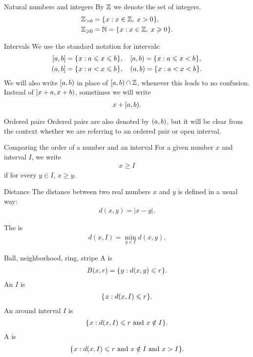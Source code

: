 \documentclass[12pt]{memoir}
\begin{document}
\begin{flushdescription}

\item [Natural numbers and integers] 
By $\mathbb{Z}$ we denote the set of integers.
\begin{align*}
   \mathbb{Z}_{>0}&=\mathopen\{\mskip 1mu x : x\in \mathbb{Z},\;  x>0\mskip 1mu\mathclose\}, \\
   \mathbb{Z}_{\geqslant 0}&=\mathbb{N}=\mathopen\{\mskip 1mu x : x\in \mathbb{Z},\;  x\geqslant 0\mskip 1mu\mathclose\}.
\end{align*}

\item [Intervals]
We use the standard notation for intervals:
\begin{align*}
   [a,b]&=\mathopen\{\mskip 1mu x : a\leqslant x \leqslant b\mskip 1mu\mathclose\},\quad [a,b)=\mathopen\{\mskip 1mu x : a\leqslant x < b\mskip 1mu\mathclose\}, \\
   (a,b]&=\mathopen\{\mskip 1mu x : a< x \leqslant b\mskip 1mu\mathclose\}, \quad  (a,b)=\mathopen\{\mskip 1mu x : a< x < b\mskip 1mu\mathclose\}.
\end{align*}
We will also write \( [a,b) \) in place of \( [a,b)\cap \mathbb{Z} \), 
whenever this leads to no confusion.
Instead of \( [x+a,x+b) \), sometimes we will write 
\begin{align*}x + [a,b).\end{align*}

\item [Ordered pairs]
Ordered pairs are also denoted by \( (a,b) \),
but it will be clear from the context whether we are
referring to an ordered pair or open interval.

\item [Comparing the order of a number and an interval]
For a given number $x$ and interval $I$, we
write
\begin{align*} x \ge I \end{align*}
if for every $y\in I$,  $x \ge y$.

\item [Distance]
The distance between two real numbers $x$ and $y$ is defined
in a usual way:
\begin{align*}
    d(x,y)= |x-y|.
\end{align*}

The   is
\begin{align*}
    d(x,I)= \min_{y\in I}d(x,y).
\end{align*}

\item [Ball, neighborhood, ring, stripe]
A  is
\begin{align*}
    B(x,r)= \mathopen\{\mskip 1mu y : d(x,y)\leqslant r\mskip 1mu\mathclose\}.
\end{align*}
An  $I$ is
\begin{align*}
    \mathopen\{\mskip 1mu x : d(x,I)\leqslant r\mskip 1mu\mathclose\}.
\end{align*}
An  around interval $I$ is
\begin{align*}
    \mathopen\{\mskip 1mu x : d(x,I)\leqslant r \text{\rmfamily\mdseries\upshape{ and }} x \notin I\mskip 1mu\mathclose\}.
\end{align*}
A  is
\begin{align*}
    \mathopen\{\mskip 1mu x : d(x,I)\leqslant r \text{\rmfamily\mdseries\upshape{ and }} x \notin I \text{\rmfamily\mdseries\upshape{ and }} x>I\mskip 1mu\mathclose\}.
\end{align*}


\end{flushdescription}
\end{document}
